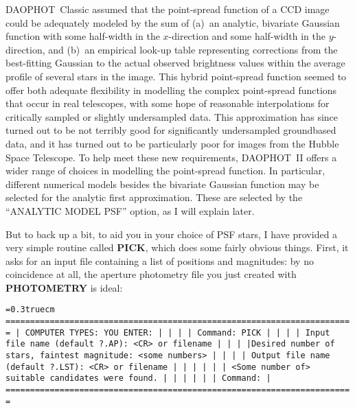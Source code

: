 DAOPHOT~Classic assumed that the point-spread function of a CCD image
could be adequately modeled by the sum of (a)~an analytic, bivariate
Gaussian function with some half-width in the $x$-direction and some
half-width in the $y$-direction, and (b)~an empirical look-up table
representing corrections from the best-fitting Gaussian to the actual
observed brightness values within the average profile of several stars
in the image.  This hybrid point-spread function seemed to offer both
adequate flexibility in modelling the complex point-spread functions
that occur in real telescopes, with some hope of reasonable
interpolations for critically sampled or slightly undersampled data.
This approximation has since turned out to be not terribly good for
significantly undersampled groundbased data, and it has turned out to
be particularly poor for images from the Hubble Space Telescope.  To
help meet these new requirements, DAOPHOT~II offers a wider range of
choices in modelling the point-spread function.  In particular,
different numerical models besides the bivariate Gaussian function may
be selected for the analytic first approximation.  These are selected
by the ``ANALYTIC MODEL PSF'' option, as I will explain later.

But to back up a bit, to aid you in your choice of PSF stars, I have
provided a very simple routine called {\bf PICK}, which does some
fairly obvious things.  First, it asks for an input file containing a
list of positions and magnitudes:  by no coincidence at all, the
aperture photometry file you just created with {\bf PHOTOMETRY} is
ideal:

\bigskip
{\noindent\obeylines\obeyspaces\frenchspacing\tt\baselineskip=0.3truecm
=======================================================================
| COMPUTER TYPES:                                  YOU ENTER:         |
|                                                                     |
| Command:                                         PICK               |
|                                                                     |
|             Input file name (default ?.AP):      <CR> or filename   |
|                                                                     |
|Desired number of stars, faintest magnitude:      <some numbers>     |
|                                                                     |
|           Output file name (default ?.LST):      <CR> or filename   |
|                                                                     |
|                                                                     |
|  <Some number of> suitable candidates were found.                   |
|                                                                     |
|                                                                     |
| Command:                                                            |
=======================================================================
}
\bigskip

